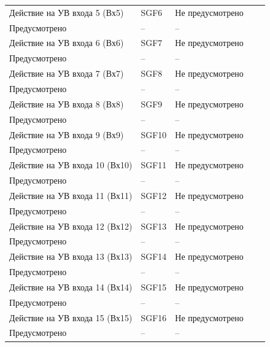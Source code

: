\begin{longtable}{|>{\centering\arraybackslash}m{5.3cm}|>{\centering\arraybackslash}m{3.3cm}|>{\centering\arraybackslash}m{4.2cm}|>{\centering\arraybackslash}m{1.8cm}|>{\centering\arraybackslash}m{1cm}|}
\hline
\centering Действие на УВ входа 5 (Вх5)  & \centering SGF6 & \centering Не предусмотрено \\ Предусмотрено & \centering -- & \centering \arraybackslash -- \\
\hline
\centering Действие на УВ входа 6 (Вх6)  & \centering SGF7 & \centering Не предусмотрено \\ Предусмотрено & \centering -- & \centering \arraybackslash -- \\
\hline
\centering Действие на УВ входа 7 (Вх7)  & \centering SGF8 & \centering Не предусмотрено \\ Предусмотрено & \centering -- & \centering \arraybackslash -- \\
\hline
\centering Действие на УВ входа 8 (Вх8)  & \centering SGF9 & \centering Не предусмотрено \\ Предусмотрено & \centering -- & \centering \arraybackslash -- \\
\hline
\centering Действие на УВ входа 9 (Вх9)  & \centering SGF10 & \centering Не предусмотрено \\ Предусмотрено & \centering -- & \centering \arraybackslash -- \\
\hline
\centering Действие на УВ входа 10 (Вх10)  & \centering SGF11 & \centering Не предусмотрено \\ Предусмотрено & \centering -- & \centering \arraybackslash -- \\
\hline
\centering Действие на УВ входа 11 (Вх11)  & \centering SGF12 & \centering Не предусмотрено \\ Предусмотрено & \centering -- & \centering \arraybackslash -- \\
\hline
\centering Действие на УВ входа 12 (Вх12)  & \centering SGF13 & \centering Не предусмотрено \\ Предусмотрено & \centering -- & \centering \arraybackslash -- \\
\hline
\centering Действие на УВ входа 13 (Вх13)  & \centering SGF14 & \centering Не предусмотрено \\ Предусмотрено & \centering -- & \centering \arraybackslash -- \\
\hline
\centering Действие на УВ входа 14 (Вх14)  & \centering SGF15 & \centering Не предусмотрено \\ Предусмотрено & \centering -- & \centering \arraybackslash -- \\
\hline
\centering Действие на УВ входа 15 (Вх15)  & \centering SGF16 & \centering Не предусмотрено \\ Предусмотрено & \centering -- & \centering \arraybackslash -- \\

\end{longtable}
